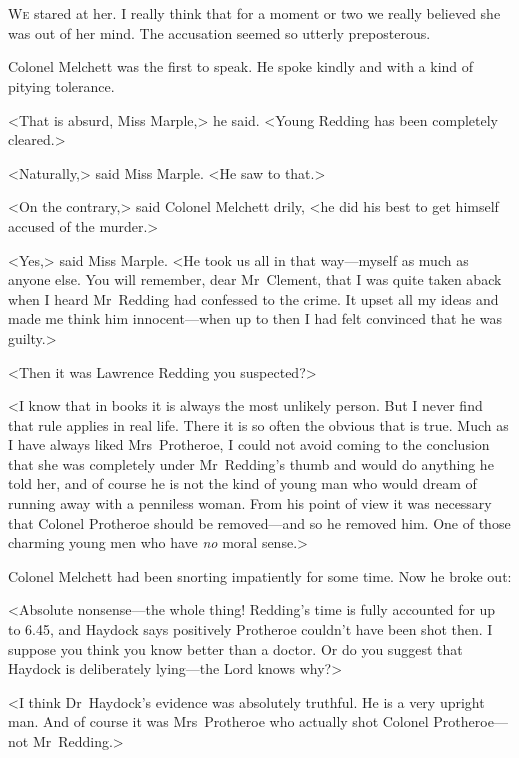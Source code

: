 \chapter[Chapter  \thechapter]{}


\lettrine{W}{e} stared at her. I really think that for a moment or two we really believed she was out of her mind. The accusation seemed so utterly preposterous.

\zz
Colonel Melchett was the first to speak. He spoke kindly and with a kind of pitying tolerance.

<That is absurd, Miss Marple,> he said. <Young Redding has been completely cleared.>

<Naturally,> said Miss Marple. <He saw to that.>

<On the contrary,> said Colonel Melchett drily, <he did his best to get himself accused of the murder.>

<Yes,> said Miss Marple. <He took us all in that way—myself as much as anyone else. You will remember, dear Mr~Clement, that I was quite taken aback when I heard Mr~Redding had confessed to the crime. It upset all my ideas and made me think him innocent—when up to then I had felt convinced that he was guilty.>

<Then it was Lawrence Redding you suspected?>

<I know that in books it is always the most unlikely person. But I never find that rule applies in real life. There it is so often the obvious that is true. Much as I have always liked Mrs~Protheroe, I could not avoid coming to the conclusion that she was completely under Mr~Redding's thumb and would do anything he told her, and of course he is not the kind of young man who would dream of running away with a penniless woman. From his point of view it was necessary that Colonel Protheroe should be removed—and so he removed him. One of those charming young men who have \emph{no} moral sense.>

Colonel Melchett had been snorting impatiently for some time. Now he broke out:

<Absolute nonsense—the whole thing! Redding's time is fully accounted for up to 6.45, and Haydock says positively Protheroe couldn't have been shot then. I suppose you think you know better than a doctor. Or do you suggest that Haydock is deliberately lying—the Lord knows why?>

<I think Dr~Haydock's evidence was absolutely truthful. He is a very upright man. And of course it was Mrs~Protheroe who actually shot Colonel Protheroe—not Mr~Redding.>

